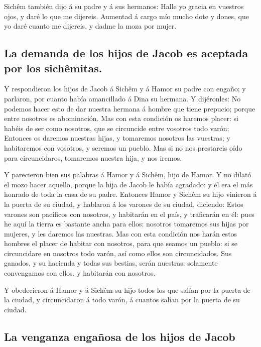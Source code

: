  Sichêm también dijo á su padre y á sus hermanos: Halle yo
gracia en vuestros ojos, y daré lo que me dijereis. 
Aumentad á cargo mío mucho dote y dones, que yo daré cuanto me dijereis,
y dadme la moza por mujer.

\hypertarget{la-demanda-de-los-hijos-de-jacob-es-aceptada-por-los-sichuxeamitas.}{%
\subsection{La demanda de los hijos de Jacob es aceptada por los
sichêmitas.}\label{la-demanda-de-los-hijos-de-jacob-es-aceptada-por-los-sichuxeamitas.}}

 Y respondieron los hijos de Jacob á Sichêm y á Hamor su
padre con engaño; y parlaron, por cuanto había amancillado á Dina su
hermana.  Y dijéronles: No podemos hacer esto de dar
nuestra hermana á hombre que tiene prepucio; porque entre nosotros es
abominación.  Mas con esta condición os haremos placer: si
habéis de ser como nosotros, que se circuncide entre vosotros todo
varón;  Entonces os daremos nuestras hijas, y tomaremos
nosotros las vuestras; y habitaremos con vosotros, y seremos un pueblo.
 Mas si no nos prestareis oído para circuncidaros,
tomaremos nuestra hija, y nos iremos.

 Y parecieron bien sus palabras á Hamor y á Sichêm, hijo de
Hamor.  Y no dilató el mozo hacer aquello, porque la hija
de Jacob le había agradado: y él era el más honrado de toda la casa de
su padre.  Entonces Hamor y Sichêm su hijo vinieron á la
puerta de su ciudad, y hablaron á los varones de su ciudad, diciendo:
 Estos varones son pacíficos con nosotros, y habitarán en
el país, y traficarán en él: pues he aquí la tierra es bastante ancha
para ellos: nosotros tomaremos sus hijas por mujeres, y les daremos las
nuestras.  Mas con esta condición nos harán estos hombres
el placer de habitar con nosotros, para que seamos un pueblo: si se
circuncidare en nosotros todo varón, así como ellos son circuncidados.
 Sus ganados, y su hacienda y todas sus bestias, serán
nuestras: solamente convengamos con ellos, y habitarán con nosotros.

 Y obedecieron á Hamor y á Sichêm su hijo todos los que
salían por la puerta de la ciudad, y circuncidaron á todo varón, á
cuantos salían por la puerta de su ciudad.

\hypertarget{la-venganza-engauxf1osa-de-los-hijos-de-jacob}{%
\subsection{La venganza engañosa de los hijos de
Jacob}\label{la-venganza-engauxf1osa-de-los-hijos-de-jacob}}

